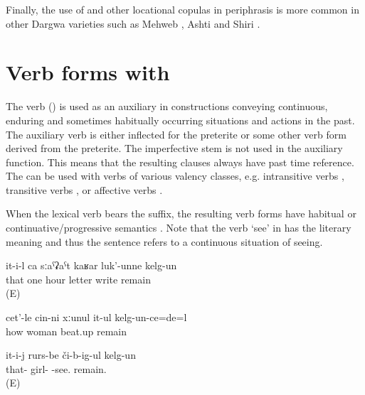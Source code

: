 Finally, the use of  and other locational copulas in periphrasis is more common in other Dargwa varieties such as Mehweb \citep{Daniel2015}, Ashti \citep{Belyaev2012} and Shiri \citep{BelyaevInPreparation}.



\section{Verb forms with \protect{} \protect{}}
\label{sec:Verb forms with kelgw- remain}

The verb  ()  is used as an auxiliary in constructions conveying continuous, enduring and sometimes habitually occurring situations and actions in the past. The auxiliary verb is either inflected for the preterite  or some other verb form derived from the preterite. The imperfective stem  is not used in the auxiliary function. This means that the resulting clauses always have  past time reference. The  can be used with verbs of various valency classes, e.g. intransitive verbs , transitive verbs , or affective verbs . 

When the lexical verb bears the  suffix, the resulting verb forms have habitual or continuative\slash progressive semantics . Note that the verb `see' in  has the literary meaning and thus the sentence refers to a continuous situation of seeing.

\begin{exe}
	\ex	\label{ex:‎He wrote the letter in one hour}
	\gll	it-i-l	ca	sːaˁʡaˁt	kaʁar	luk'-unne	kelg-un\\
		that	one	hour	letter	write	remain\\
	\glt	{} (E)

	\ex	\label{ex:[When the man was in prison he remembered a lot], how he constantly beat up his wife}
	\gll	cet'-le	cin-ni	xːunul	it-ul	kelg-un-ce=de=l\\
		how		woman	beat.up	remain\\
	\glt	{}

	\ex	\label{‎‎He was seeing the girls.}
	\gll it-i-j	rurs-be	či-b-ig-ul	kelg-un\\
	that-	girl-	-see.	remain.\\
	\glt {} (E)
\end{exe}
	
